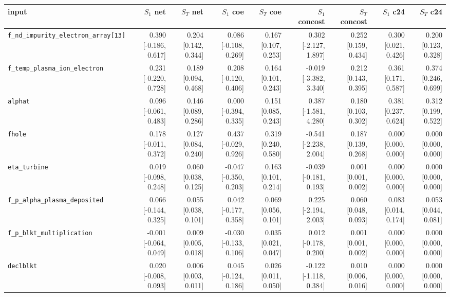 \begin{tabular}{lrrrrrrrr}
\toprule
input & $S_1$ net & $S_T$ net & $S_1$ coe & $S_T$ coe & $S_1$ concost & $S_T$ concost & $S_1$ c24 & $S_T$ c24 \\
\midrule
\texttt{f\_nd\_impurity\_electron\_array[13]} & 0.390 [-0.186, 0.617] & 0.204 [0.142, 0.344] & 0.086 [-0.108, 0.269] & 0.167 [0.107, 0.253] & 0.302 [-2.127, 1.897] & 0.252 [0.159, 0.434] & 0.300 [0.021, 0.426] & 0.200 [0.123, 0.328] \\
\texttt{f\_temp\_plasma\_ion\_electron} & 0.231 [-0.220, 0.728] & 0.189 [0.094, 0.468] & 0.208 [-0.120, 0.406] & 0.164 [0.101, 0.243] & -0.019 [-3.382, 3.340] & 0.212 [0.143, 0.395] & 0.361 [0.171, 0.587] & 0.374 [0.246, 0.699] \\
\texttt{alphat} & 0.096 [-0.061, 0.483] & 0.146 [0.089, 0.286] & 0.000 [-0.394, 0.335] & 0.151 [0.085, 0.243] & 0.387 [-1.581, 4.280] & 0.180 [0.103, 0.302] & 0.381 [0.237, 0.624] & 0.312 [0.199, 0.522] \\
\texttt{fhole} & 0.178 [-0.011, 0.372] & 0.127 [0.084, 0.240] & 0.437 [-0.029, 0.926] & 0.319 [0.240, 0.580] & -0.541 [-2.238, 2.004] & 0.187 [0.139, 0.268] & 0.000 [0.000, 0.000] & 0.000 [0.000, 0.000] \\
\texttt{eta\_turbine} & 0.019 [-0.098, 0.248] & 0.060 [0.038, 0.125] & -0.047 [-0.350, 0.203] & 0.163 [0.101, 0.214] & -0.039 [-0.181, 0.193] & 0.001 [0.001, 0.002] & 0.000 [0.000, 0.000] & 0.000 [0.000, 0.000] \\
\texttt{f\_p\_alpha\_plasma\_deposited} & 0.066 [-0.144, 0.325] & 0.055 [0.038, 0.101] & 0.042 [-0.177, 0.358] & 0.069 [0.056, 0.101] & 0.225 [-2.194, 2.003] & 0.060 [0.048, 0.093] & 0.083 [0.014, 0.174] & 0.053 [0.044, 0.081] \\
\texttt{f\_p\_blkt\_multiplication} & -0.001 [-0.064, 0.049] & 0.009 [0.005, 0.018] & -0.030 [-0.133, 0.106] & 0.035 [0.021, 0.047] & 0.012 [-0.178, 0.200] & 0.001 [0.001, 0.002] & 0.000 [0.000, 0.000] & 0.000 [0.000, 0.000] \\
\texttt{declblkt} & 0.020 [-0.008, 0.093] & 0.006 [0.003, 0.011] & 0.045 [-0.124, 0.186] & 0.026 [0.011, 0.050] & -0.122 [-1.118, 0.384] & 0.010 [0.006, 0.016] & 0.000 [0.000, 0.000] & 0.000 [0.000, 0.000] \\

\end{tabular}
